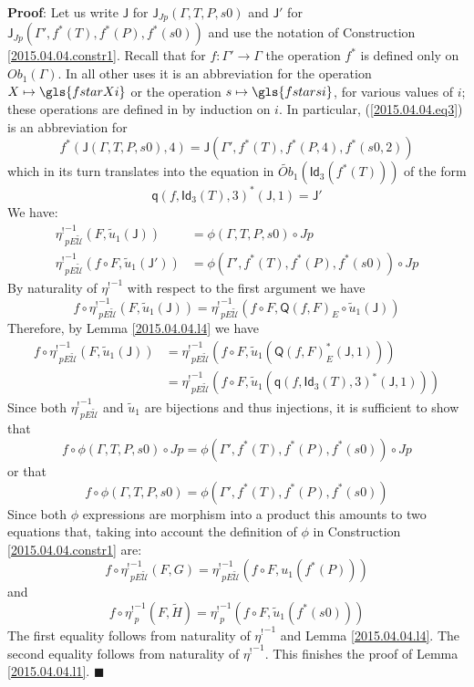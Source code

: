 \documentclass[12pt]{article}
\numberwithin{equation}{section}
\newenvironment{myproof}{{\bf Proof}:}{$\blacksquare$ \vskip 5mm }
\newcommand{\sr}{\rightarrow}
\newcommand{\wt}{\widetilde}
\newcommand{\q}{\mathsf{q}}
\newcommand{\Idx}{\mathsf{Id}_3} %
\newcommand{\J}{\mathsf{J}}
\newcommand{\U}{\mathcal{U}}
\newcommand{\Q}{\mathsf{Q}}
\newcommand{\etashriek}{\eta^!}
\newcommand{\etaunshriek}{{\etashriek}^{-1}}
\newcommand{\Obwt}{\wt{Ob}}
\begin{document}
\begin{myproof}
Let us write $\J$ for $\J_{Jp}(\Gamma,T,P,s0)$ and $\J'$ for
$\J_{Jp}(\Gamma',f^*(T),f^*(P),f^*(s0))$ and use the notation of Construction
\ref{2015.04.04.constr1}. Recall that for $f:\Gamma'\sr \Gamma$ the operation
$f^*$ is defined only on $Ob_1(\Gamma)$. In all other uses it is an
abbreviation for the operation $X\mapsto \gls{fstarXi}$ or the operation $s\mapsto \gls{fstarsi}$,
for various values of $i$; these operations are defined in \cite[\S 3]{Csubsystems} by induction on $i$.
In particular, (\ref{2015.04.04.eq3}) is an abbreviation for
%
$$f^*(\J(\Gamma,T,P,s0),4)=\J(\Gamma',f^*(T),f^*(P,4),f^*(s0,2))$$
%
which in its turn translates into the equation in $\Obwt_1(\Idx(f^*(T)))$ of
the form
%
$$\q(f,\Idx(T),3)^*(\J,1)=\J'$$
%
We have:
%
\begin{align*}
  \etaunshriek_{pE\wt{\U}}(F,\wt{u}_1(\J))&=\phi(\Gamma,T,P,s0)\circ Jp \\
  \etaunshriek_{pE\wt{\U}}(f\circ F, \wt{u}_1(\J'))&=\phi(\Gamma',f^*(T),f^*(P),f^*(s0))\circ Jp
\end{align*}
%
By naturality of $\etaunshriek$ with respect to the first argument we have
%
$$f\circ \etaunshriek_{pE\wt{\U}}(F,\wt{u}_1(\J))=\etaunshriek_{pE\wt{\U}}(f\circ F,
\Q(f,F)_{E}\circ \wt{u}_1(\J))$$
%
Therefore, by Lemma \ref{2015.04.04.l4} we have
%
\begin{align*}
  f\circ \etaunshriek_{pE\wt{\U}}(F,\wt{u}_1(\J))
    & = \etaunshriek_{pE\wt{\U}}(f\circ F, \wt{u}_1(\Q(f,F)_{E}^*(\J,1))) \\
    & = \etaunshriek_{pE\wt{\U}}(f\circ F, \wt{u}_1(\q(f,\Idx(T),3)^*(\J,1)))
\end{align*}
%
Since both $\etaunshriek_{pE\wt{\U}}$ and $\wt{u}_1$ are bijections and thus
injections, it is sufficient to show that
%
$$f\circ \phi(\Gamma,T,P,s0)\circ Jp = \phi(\Gamma',f^*(T),f^*(P),f^*(s0))\circ
Jp$$
%
or that
%
$$f\circ \phi(\Gamma,T,P,s0)=\phi(\Gamma',f^*(T),f^*(P),f^*(s0))$$
%
Since both $\phi$ expressions are morphism into a product this amounts to two
equations that, taking into account the definition of $\phi$ in Construction
\ref{2015.04.04.constr1} are:
%
$$f\circ \etaunshriek_{pE\wt{\U}}(F,G)=\etaunshriek_{pE\wt{\U}}(f\circ F, u_1(f^*(P)))$$
%
and
%
$$f\circ \etaunshriek_p(F,\wt{H})=\etaunshriek_p(f\circ F, \wt{u}_1(f^*(s0)))$$
%
The first equality follows from naturality of $\etaunshriek$ and Lemma
\ref{2015.04.04.l4}. The second equality follows from naturality of
$\etaunshriek$. This finishes the proof of Lemma \ref{2015.04.04.l1}.
\end{myproof}
\end{document}
